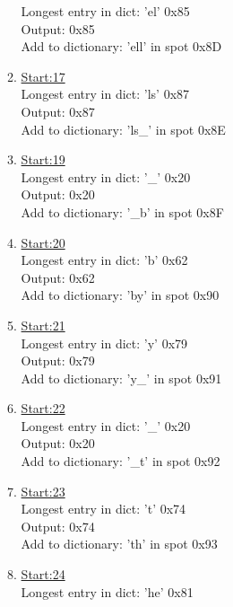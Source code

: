 \documentclass[11pt]{article}
\begin{document}
\begin{enumerate}
\begin{multicols}{2}
\begin{enumerate}
                Longest entry in dict: 'el' 0x85 \\
                Output: 0x85    \\
                Add to dictionary: 'ell' in spot 0x8D    
            \item
                \underline{Start:17}  \\
                Longest entry in dict: 'ls' 0x87 \\
                Output: 0x87    \\
                Add to dictionary: 'ls\_' in spot 0x8E    
            \item
                \underline{Start:19}  \\
                Longest entry in dict: '\_' 0x20 \\
                Output: 0x20    \\
                Add to dictionary: '\_b' in spot 0x8F    
            \item
                \underline{Start:20}  \\
                Longest entry in dict: 'b' 0x62 \\
                Output: 0x62    \\
                Add to dictionary: 'by' in spot 0x90
            \item
                \underline{Start:21}  \\
                Longest entry in dict: 'y' 0x79 \\
                Output: 0x79    \\
                Add to dictionary: 'y\_' in spot 0x91    
            \item
                \underline{Start:22}  \\
                Longest entry in dict: '\_' 0x20 \\
                Output: 0x20    \\
                Add to dictionary: '\_t' in spot 0x92
            \item
                \underline{Start:23}  \\
                Longest entry in dict: 't' 0x74 \\
                Output: 0x74    \\
                Add to dictionary: 'th' in spot 0x93
            \item
                \underline{Start:24}  \\
                Longest entry in dict: 'he' 0x81 \\

\end{enumerate}
\end{multicols}
\end{enumerate}
\end{document}
